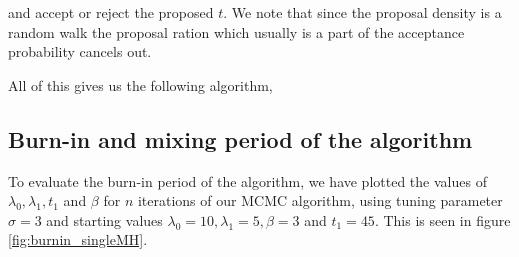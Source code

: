 and accept or reject the proposed $t$. We note that since the proposal density is a random walk the proposal ration which usually is a part of the acceptance probability cancels out. 

All of this gives us the following algorithm, 






\subsection{Burn-in and mixing period of the algorithm}

To evaluate the burn-in period of the algorithm, we have plotted the values of $\lambda_0, \lambda_1, t_1$ and $\beta$ for $n$ iterations of our MCMC algorithm, using tuning parameter $\sigma = 3$ and starting values $\lambda_0 = 10, \lambda_1 = 5, \beta = 3$ and $t_1 = 45$. This is seen in figure \ref{fig:burnin_singleMH}. 


